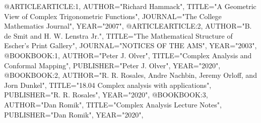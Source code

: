 @ARTICLE{ARTICLE:1,
    AUTHOR="Richard Hammack",
    TITLE="A Geometric View of Complex Trigonometric Functions",
    JOURNAL="The College Mathematics Journal",
    YEAR="2007",
}
@ARTICLE{ARTICLE:2,
    AUTHOR="B. de Smit and H. W. Lenstra Jr.",
    TITLE="The Mathematical Structure of Escher’s Print Gallery",
    JOURNAL="NOTICES OF THE AMS",
    YEAR="2003",
}
@BOOK{BOOK:1,
    AUTHOR="Peter J. Olver",
    TITLE="Complex Analysis and Conformal Mapping",
    PUBLISHER="Peter J. Olver",
    YEAR="2020",
}
@BOOK{BOOK:2,
    AUTHOR="R. R. Rosales, Andre Nachbin, Jeremy Orloff, and Jorn Dunkel",
    TITLE="18.04 Complex analysis with applications",
    PUBLISHER="R. R. Rosales",
    YEAR="2020",
}
@BOOK{BOOK:3,
    AUTHOR="Dan Romik",
    TITLE="Complex Analysis Lecture Notes",
    PUBLISHER="Dan Romik",
    YEAR="2020",
}
